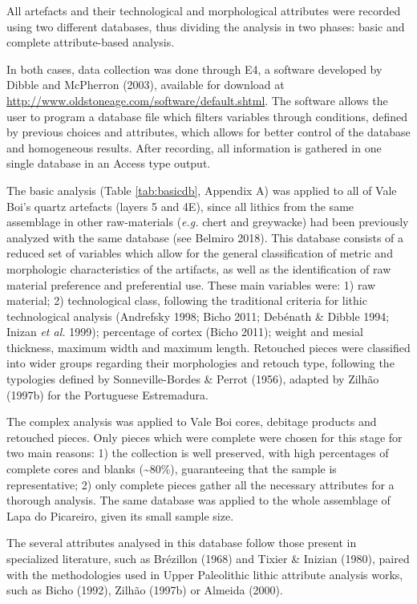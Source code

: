 \documentclass[12pt,twoside]{reedthesis}
\begin{document}
All artefacts and their technological and morphological attributes were recorded using two different databases, thus dividing the analysis in two phases: basic and complete attribute-based analysis.

In both cases, data collection was done through E4, a software developed by Dibble and McPherron (2003), available for download at \url{http://www.oldstoneage.com/software/default.shtml}. The software allows the user to program a database file which filters variables through conditions, defined by previous choices and attributes, which allows for better control of the database and homogeneous results. After recording, all information is gathered in one single database in an Access type output.

The basic analysis (Table \ref{tab:basicdb}, Appendix A) was applied to all of Vale Boi's quartz artefacts (layers 5 and 4E), since all lithics from the same assemblage in other raw-materials (\emph{e.g.} chert and greywacke) had been previously analyzed with the same database (see Belmiro 2018). This database consists of a reduced set of variables which allow for the general classification of metric and morphologic characteristics of the artifacts, as well as the identification of raw material preference and preferential use. These main variables were: 1) raw material; 2) technological class, following the traditional criteria for lithic technological analysis (Andrefsky 1998; Bicho 2011; Debénath \& Dibble 1994; Inizan \emph{et al.} 1999); percentage of cortex (Bicho 2011); weight and mesial thickness, maximum width and maximum length. Retouched pieces were classified into wider groups regarding their morphologies and retouch type, following the typologies defined by Sonneville-Bordes \& Perrot (1956), adapted by Zilhão (1997b) for the Portuguese Estremadura.

The complex analysis was applied to Vale Boi cores, debitage products and retouched pieces. Only pieces which were complete were chosen for this stage for two main reasons: 1) the collection is well preserved, with high percentages of complete cores and blanks (\textasciitilde80\%), guaranteeing that the sample is representative; 2) only complete pieces gather all the necessary attributes for a thorough analysis. The same database was applied to the whole assemblage of Lapa do Picareiro, given its small sample size.

The several attributes analysed in this database follow those present in specialized literature, such as Brézillon (1968) and Tixier \& Inizian (1980), paired with the methodologies used in Upper Paleolithic lithic attribute analysis works, such as Bicho (1992), Zilhão (1997b) or Almeida (2000).
\end{document}
